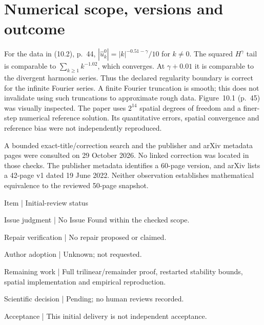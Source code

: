 \documentclass[10pt]{article}
\begin{document}
\section*{Numerical scope, versions and outcome}
For the data in (10.2), p. 44, \(|\widehat u_k^0|=|k|^{-0.51-\gamma}/10\) for \(k\ne0\). The squared \(H^\gamma\) tail is comparable to \(\sum_{k\ge1}k^{-1.02}\), which converges. At \(\gamma+0.01\) it is comparable to the divergent harmonic series. Thus the declared regularity boundary is correct for the infinite Fourier series. A finite Fourier truncation is smooth; this does not invalidate using such truncations to approximate rough data. Figure 10.1 (p. 45) was visually inspected. The paper uses \(2^{14}\) spatial degrees of freedom and a finer-step numerical reference solution. Its quantitative errors, spatial convergence and reference bias were not independently reproduced.\par
A bounded exact-title/correction search and the publisher and arXiv metadata pages were consulted on 29 October 2026. No linked correction was located in those checks. The publisher metadata identifies a 60-page version, and arXiv lists a 42-page v1 dated 19 June 2022. Neither observation establishes mathematical equivalence to the reviewed 50-page snapshot.\par
Item | Initial-review status\par
Issue judgment | No Issue Found within the checked scope.\par
Repair verification | No repair proposed or claimed.\par
Author adoption | Unknown; not requested.\par
Remaining work | Full trilinear/remainder proof, restarted stability bounds, spatial implementation and empirical reproduction.\par
Scientific decision | Pending; no human reviews recorded.\par
Acceptance | This initial delivery is not independent acceptance.\par
\end{document}
